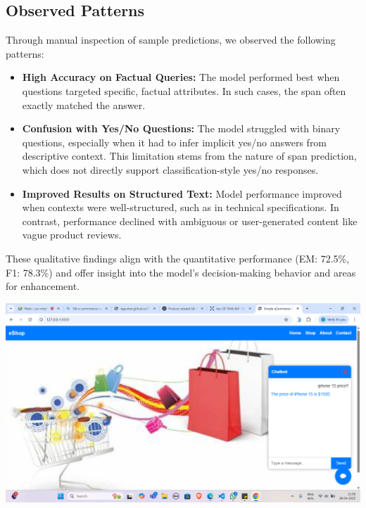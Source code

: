 \documentclass[10pt,conference]{IEEEtran}
\begin{document}
\subsection{Observed Patterns}
Through manual inspection of sample predictions, we observed the following patterns:
\begin{itemize}
    \item \textbf{High Accuracy on Factual Queries:} The model performed best when questions targeted specific, factual attributes. In such cases, the span often exactly matched the answer.
    
    \item \textbf{Confusion with Yes/No Questions:} The model struggled with binary questions, especially when it had to infer implicit yes/no answers from descriptive context. This limitation stems from the nature of span prediction, which does not directly support classification-style yes/no responses.
    
    \item \textbf{Improved Results on Structured Text:} Model performance improved when contexts were well-structured, such as in technical specifications. In contrast, performance declined with ambiguous or user-generated content like vague product reviews.
\end{itemize}

These qualitative findings align with the quantitative performance (EM: 72.5\%, F1: 78.3\%) and offer insight into the model’s decision-making behavior and areas for enhancement. \\


\begin{minipage}[t]{0.50\textwidth}   %
  \centering
  \includegraphics[width=\linewidth]{fig4.png}
  \label{fig:Result 1}
\end{minipage} \\
\end{document}
